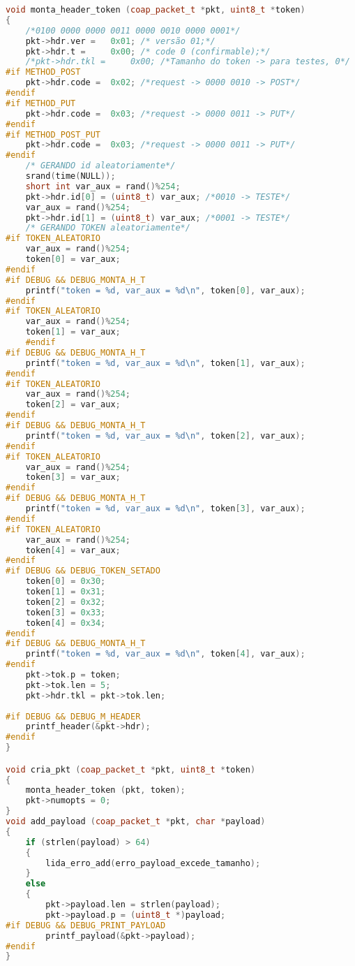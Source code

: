 \begin{lstlisting}[language=C++]
void monta_header_token (coap_packet_t *pkt, uint8_t *token)
{
	/*0100 0000 0000 0011 0000 0010 0000 0001*/
	pkt->hdr.ver = 	 0x01; /* versão 01;*/
	pkt->hdr.t = 	 0x00; /* code 0 (confirmable);*/
	/*pkt->hdr.tkl = 	 0x00; /*Tamanho do token -> para testes, 0*/
#if METHOD_POST
	pkt->hdr.code =  0x02; /*request -> 0000 0010 -> POST*/
#endif
#if METHOD_PUT
	pkt->hdr.code =  0x03; /*request -> 0000 0011 -> PUT*/
#endif
#if METHOD_POST_PUT
	pkt->hdr.code =  0x03; /*request -> 0000 0011 -> PUT*/
#endif
	/* GERANDO id aleatoriamente*/
	srand(time(NULL));
	short int var_aux = rand()%254;
	pkt->hdr.id[0] = (uint8_t) var_aux; /*0010 -> TESTE*/
	var_aux = rand()%254;
	pkt->hdr.id[1] = (uint8_t) var_aux; /*0001 -> TESTE*/
	/* GERANDO TOKEN aleatoriamente*/
#if TOKEN_ALEATORIO
	var_aux = rand()%254;
	token[0] = var_aux;
#endif
#if DEBUG && DEBUG_MONTA_H_T
	printf("token = %d, var_aux = %d\n", token[0], var_aux);
#endif
#if TOKEN_ALEATORIO
	var_aux = rand()%254;
	token[1] = var_aux;
	#endif
#if DEBUG && DEBUG_MONTA_H_T
	printf("token = %d, var_aux = %d\n", token[1], var_aux);
#endif
#if TOKEN_ALEATORIO
	var_aux = rand()%254;
	token[2] = var_aux;
#endif
#if DEBUG && DEBUG_MONTA_H_T
	printf("token = %d, var_aux = %d\n", token[2], var_aux);
#endif
#if TOKEN_ALEATORIO
	var_aux = rand()%254;
	token[3] = var_aux;
#endif
#if DEBUG && DEBUG_MONTA_H_T
	printf("token = %d, var_aux = %d\n", token[3], var_aux);
#endif
#if TOKEN_ALEATORIO
	var_aux = rand()%254;
	token[4] = var_aux;
#endif
#if DEBUG && DEBUG_TOKEN_SETADO
	token[0] = 0x30;
	token[1] = 0x31;
	token[2] = 0x32;
	token[3] = 0x33;
	token[4] = 0x34;
#endif
#if DEBUG && DEBUG_MONTA_H_T
	printf("token = %d, var_aux = %d\n", token[4], var_aux);
#endif
	pkt->tok.p = token;
	pkt->tok.len = 5;
	pkt->hdr.tkl = pkt->tok.len;
	
#if DEBUG && DEBUG_M_HEADER
	printf_header(&pkt->hdr);
#endif
}

void cria_pkt (coap_packet_t *pkt, uint8_t *token)
{
	monta_header_token (pkt, token);
	pkt->numopts = 0;
}
void add_payload (coap_packet_t *pkt, char *payload)
{
	if (strlen(payload) > 64)
	{
		lida_erro_add(erro_payload_excede_tamanho);
	}
	else
	{
		pkt->payload.len = strlen(payload);
		pkt->payload.p = (uint8_t *)payload;
#if DEBUG && DEBUG_PRINT_PAYLOAD
		printf_payload(&pkt->payload);
#endif
}


\end{lstlisting}
